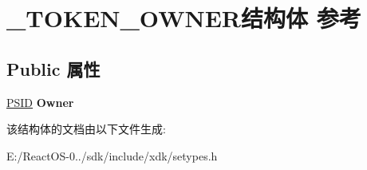 \hypertarget{struct___t_o_k_e_n___o_w_n_e_r}{}\section{\+\_\+\+T\+O\+K\+E\+N\+\_\+\+O\+W\+N\+E\+R结构体 参考}
\label{struct___t_o_k_e_n___o_w_n_e_r}
\subsection*{Public 属性}
\begin{DoxyCompactItemize}
\item 
\mbox{\label{struct___t_o_k_e_n___o_w_n_e_r_a8413fb8b68f225259f65a1aa6c8b26a4}} 
\hyperlink{struct___s_i_d}{P\+S\+ID} {\bfseries Owner}
\end{DoxyCompactItemize}


该结构体的文档由以下文件生成\+:\begin{DoxyCompactItemize}
\item 
E\+:/\+React\+O\+S-\/0../sdk/include/xdk/setypes.\+h\end{DoxyCompactItemize}
